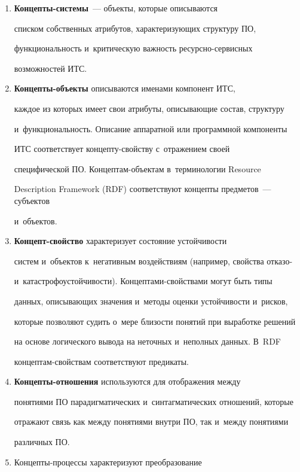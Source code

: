   \begin{enumerate}[1.]


  \item \textbf{Концепты-системы}~--- объекты, которые описываются


списком собственных атрибутов, характеризующих структуру ПО,


функциональность и~критическую важность ре\-сурс\-но-сер\-вис\-ных


возможностей ИТС.


  \item \textbf{Концепты-объекты} описываются именами компонент ИТС,


каждое из которых имеет свои атрибуты, описывающие состав, структуру


и~функциональность. Описание аппаратной или программной компоненты


ИТС соответствует кон\-цеп\-ту-свой\-ст\-ву с~отражением своей


специфической ПО. Кон\-цеп\-там-объ\-ек\-там в~терминологии Resource


Description Framework (RDF) соответствуют концепты предметов~--- субъектов


и~объектов.


  \item \textbf{Концепт-свойство} характеризует состояние устойчивости


систем и~объектов к~негативным воздействиям (например, свойства отказо-


и~катастрофоустойчивости). Кон\-цеп\-та\-ми-свой\-ст\-ва\-ми могут быть типы


данных, описывающих значения и~методы оценки устойчивости и~рисков,


которые позволяют судить о~мере близости понятий при выработке решений


на основе логического вывода на неточных и~неполных данных. В~RDF


  кон\-цеп\-там-свой\-ст\-вам соответствуют предикаты.


  \item \textbf{Концепты-отношения} используются для отображения между


понятиями ПО парадигматических и~синтагматических отношений, которые


отражают связь как между понятиями внутри ПО, так и~между понятиями


различных ПО.


  \item Концепты-процессы характеризуют преобразование



\end{enumerate}
